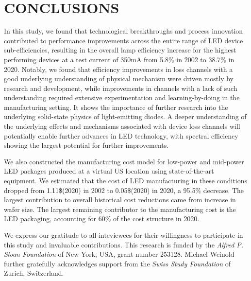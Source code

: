 \documentclass[a4paper,nocompress]{spie}  %
\begin{document}
\section{CONCLUSIONS}

    In this study, we found that technological breakthroughs and process innovation contributed to performance improvements across the entire range of LED device sub-efficiencies, resulting in the overall lamp efficiency increase for the highest performing devices at a test current of 350mA from 5.8\% in 2002 to 38.7\% in 2020. Notably, we found that efficiency improvements in loss channels with a good underlying understanding of physical mechanism were driven mostly by research and development, while improvements in channels with a lack of such understanding required extensive experimentation and learning-by-doing in the manufacturing setting. It shows the importance of further research into the underlying solid-state physics of light-emitting diodes. A deeper understanding of the underlying effects and mechanisms associated with device loss channels will potentially enable further advances in LED technology, with spectral efficiency showing the largest potential for further improvements. 

    We also constructed the manufacturing cost model for low-power and mid-power LED packages produced at a virtual US location using state-of-the-art equipment. We estimated that the cost of LED manufacturing in these conditions dropped from 1.11\$(2020) in 2002 to 0.05\$(2020) in 2020, a 95.5\% decrease. The largest contribution to overall historical cost reductions came from increase in wafer size. The largest remaining contributor to the manufacturing cost is the LED packaging, accounting for 60\% of the cost structure in 2020.

\acknowledgments %

We express our gratitude to all inteviewees for their willingness to participate in this study and invaluable contributions. This research is funded by the \textit{Alfred P. Sloan Foundation} of New York, USA, grant number 253128. Michael Weinold further gratefully acknowledges support from the \textit{Swiss Study Foundation} of Zurich, Switzerland.

\clearpage
\end{document}
